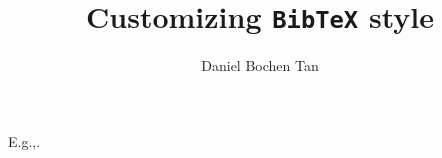 \documentclass{article}
\title{Customizing \texttt{BibTeX} style}
\author{Daniel Bochen Tan}
\begin{document}
\maketitle

E.g.,.
    


\end{document}
